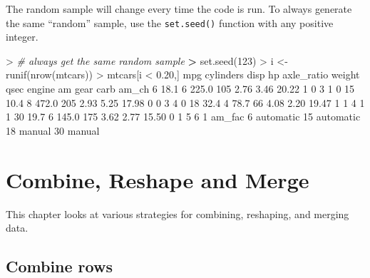 \documentclass[
]{book}
\newenvironment{Shaded}{\begin{snugshade}}{\end{snugshade}}
\newcommand{\CommentTok}[1]{\textcolor[rgb]{0.56,0.35,0.01}{\textit{#1}}}
\newcommand{\DecValTok}[1]{\textcolor[rgb]{0.00,0.00,0.81}{#1}}
\newcommand{\ErrorTok}[1]{\textcolor[rgb]{0.64,0.00,0.00}{\textbf{#1}}}
\newcommand{\FloatTok}[1]{\textcolor[rgb]{0.00,0.00,0.81}{#1}}
\newcommand{\FunctionTok}[1]{\textcolor[rgb]{0.00,0.00,0.00}{#1}}
\newcommand{\NormalTok}[1]{#1}
\newcommand{\OtherTok}[1]{\textcolor[rgb]{0.56,0.35,0.01}{#1}}
\newcommand{\SpecialCharTok}[1]{\textcolor[rgb]{0.00,0.00,0.00}{#1}}
\begin{document}
The random sample will change every time the code is run. To always generate the same ``random'' sample, use the \texttt{set.seed()} function with any positive integer.

\begin{Shaded}
\begin{Highlighting}[]
\SpecialCharTok{\textgreater{}} \CommentTok{\# always get the same random sample}
\ErrorTok{\textgreater{}} \FunctionTok{set.seed}\NormalTok{(}\DecValTok{123}\NormalTok{)}
\SpecialCharTok{\textgreater{}}\NormalTok{ i }\OtherTok{\textless{}{-}} \FunctionTok{runif}\NormalTok{(}\FunctionTok{nrow}\NormalTok{(mtcars))}
\SpecialCharTok{\textgreater{}}\NormalTok{ mtcars[i }\SpecialCharTok{\textless{}} \FloatTok{0.20}\NormalTok{,]}
\NormalTok{    mpg cylinders  disp  hp axle\_ratio weight  qsec engine am gear carb am\_ch}
\DecValTok{6}  \FloatTok{18.1}         \DecValTok{6} \FloatTok{225.0} \DecValTok{105}       \FloatTok{2.76}   \FloatTok{3.46} \FloatTok{20.22}      \DecValTok{1}  \DecValTok{0}    \DecValTok{3}    \DecValTok{1}     \DecValTok{0}
\DecValTok{15} \FloatTok{10.4}         \DecValTok{8} \FloatTok{472.0} \DecValTok{205}       \FloatTok{2.93}   \FloatTok{5.25} \FloatTok{17.98}      \DecValTok{0}  \DecValTok{0}    \DecValTok{3}    \DecValTok{4}     \DecValTok{0}
\DecValTok{18} \FloatTok{32.4}         \DecValTok{4}  \FloatTok{78.7}  \DecValTok{66}       \FloatTok{4.08}   \FloatTok{2.20} \FloatTok{19.47}      \DecValTok{1}  \DecValTok{1}    \DecValTok{4}    \DecValTok{1}     \DecValTok{1}
\DecValTok{30} \FloatTok{19.7}         \DecValTok{6} \FloatTok{145.0} \DecValTok{175}       \FloatTok{3.62}   \FloatTok{2.77} \FloatTok{15.50}      \DecValTok{0}  \DecValTok{1}    \DecValTok{5}    \DecValTok{6}     \DecValTok{1}
\NormalTok{      am\_fac}
\DecValTok{6}\NormalTok{  automatic}
\DecValTok{15}\NormalTok{ automatic}
\DecValTok{18}\NormalTok{    manual}
\DecValTok{30}\NormalTok{    manual}
\end{Highlighting}
\end{Shaded}

\hypertarget{combine-reshape-and-merge}{%
\chapter{Combine, Reshape and Merge}\label{combine-reshape-and-merge}}

This chapter looks at various strategies for combining, reshaping, and merging data.

\hypertarget{combine-rows}{%
\section{Combine rows}\label{combine-rows}}
\end{document}

